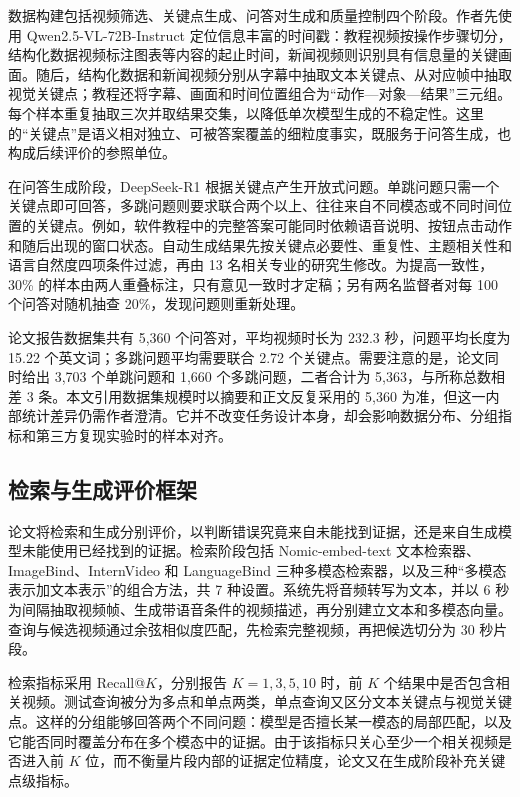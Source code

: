 数据构建包括视频筛选、关键点生成、问答对生成和质量控制四个阶段。作者先使用 Qwen2.5-VL-72B-Instruct 定位信息丰富的时间戳：教程视频按操作步骤切分，结构化数据视频标注图表等内容的起止时间，新闻视频则识别具有信息量的关键画面。随后，结构化数据和新闻视频分别从字幕中抽取文本关键点、从对应帧中抽取视觉关键点；教程还将字幕、画面和时间位置组合为“动作—对象—结果”三元组。每个样本重复抽取三次并取结果交集，以降低单次模型生成的不稳定性。这里的“关键点”是语义相对独立、可被答案覆盖的细粒度事实，既服务于问答生成，也构成后续评价的参照单位。

在问答生成阶段，DeepSeek-R1 根据关键点产生开放式问题。单跳问题只需一个关键点即可回答，多跳问题则要求联合两个以上、往往来自不同模态或不同时间位置的关键点。例如，软件教程中的完整答案可能同时依赖语音说明、按钮点击动作和随后出现的窗口状态。自动生成结果先按关键点必要性、重复性、主题相关性和语言自然度四项条件过滤，再由 13 名相关专业的研究生修改。为提高一致性，30\% 的样本由两人重叠标注，只有意见一致时才定稿；另有两名监督者对每 100 个问答对随机抽查 20\%，发现问题则重新处理\parencite{wei2026cfvbench}。

论文报告数据集共有 5,360 个问答对，平均视频时长为 232.3 秒，问题平均长度为 15.22 个英文词；多跳问题平均需要联合 2.72 个关键点。需要注意的是，论文同时给出 3,703 个单跳问题和 1,660 个多跳问题，二者合计为 5,363，与所称总数相差 3 条。本文引用数据集规模时以摘要和正文反复采用的 5,360 为准，但这一内部统计差异仍需作者澄清。它并不改变任务设计本身，却会影响数据分布、分组指标和第三方复现实验时的样本对齐。

\subsection{检索与生成评价框架}

论文将检索和生成分别评价，以判断错误究竟来自未能找到证据，还是来自生成模型未能使用已经找到的证据。检索阶段包括 Nomic-embed-text 文本检索器、ImageBind、InternVideo 和 LanguageBind 三种多模态检索器，以及三种“多模态表示加文本表示”的组合方法，共 7 种设置。系统先将音频转写为文本，并以 6 秒为间隔抽取视频帧、生成带语音条件的视频描述，再分别建立文本和多模态向量。查询与候选视频通过余弦相似度匹配，先检索完整视频，再把候选切分为 30 秒片段。

检索指标采用 Recall@$K$，分别报告 $K=1,3,5,10$ 时，前 $K$ 个结果中是否包含相关视频。测试查询被分为多点和单点两类，单点查询又区分文本关键点与视觉关键点。这样的分组能够回答两个不同问题：模型是否擅长某一模态的局部匹配，以及它能否同时覆盖分布在多个模态中的证据。由于该指标只关心至少一个相关视频是否进入前 $K$ 位，而不衡量片段内部的证据定位精度，论文又在生成阶段补充关键点级指标。

